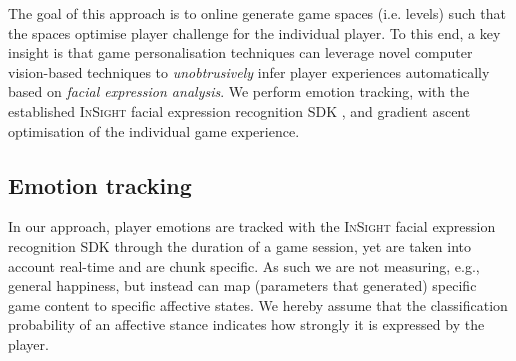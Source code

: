 \documentclass[letterpaper]{article}
\begin{document}
The goal of this approach is to online generate game spaces (i.e. levels) such that the spaces optimise player challenge for the individual player. To this end, a key insight is that game personalisation techniques can leverage novel computer vision-based techniques to \emph{unobtrusively} infer player experiences automatically based on \emph{facial expression analysis}. We perform emotion tracking, with the established \textsc{InSight} facial expression recognition SDK \cite{InSight}, and gradient ascent optimisation of the individual game experience.

\subsection{Emotion tracking}

In our approach, player emotions are tracked with the \textsc{InSight} facial expression recognition SDK \cite{InSight} through the duration of a game session, yet are taken into account real-time and are chunk specific. As such we are not measuring, e.g., general happiness, but instead can map (parameters that generated) specific game content to specific affective states. We hereby assume that the classification probability of an affective stance indicates how strongly it is expressed by the player.
\end{document}
